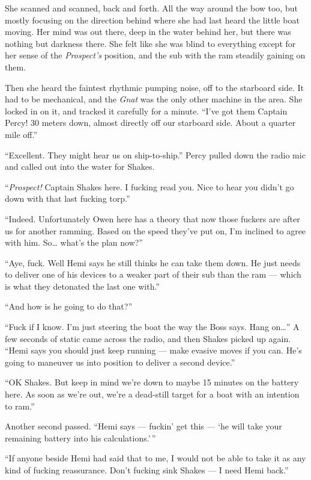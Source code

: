 \documentclass[
]{scrbook}
\begin{document}
She scanned and scanned, back and forth. All the way around the bow too,
but mostly focusing on the direction behind where she had last heard the
little boat moving. Her mind was out there, deep in the water behind
her, but there was nothing but darkness there. She felt like she was
blind to everything except for her sense of the \emph{Prospect's}
position, and the sub with the ram steadily gaining on them.

Then she heard the faintest rhythmic pumping noise, off to the starboard
side. It had to be mechanical, and the \emph{Gnat} was the only other
machine in the area. She locked in on it, and tracked it carefully for a
minute. ``I've got them Captain Percy! 30 meters down, almost directly
off our starboard side. About a quarter mile off.''

``Excellent. They might hear us on ship-to-ship.'' Percy pulled down the
radio mic and called out into the water for Shakes.

``\emph{Prospect!} Captain Shakes here. I fucking read you. Nice to hear
you didn't go down with that last fucking torp.''

``Indeed. Unfortunately Owen here has a theory that now those fuckers
are after us for another ramming. Based on the speed they've put on, I'm
inclined to agree with him. So\ldots{} what's the plan now?''

``Aye, fuck. Well Hemi says he still thinks he can take them down. He
just needs to deliver one of his devices to a weaker part of their sub
than the ram --- which is what they detonated the last one with.''

``And how is he going to do that?''

``Fuck if I know. I'm just steering the boat the way the Boss says. Hang
on\ldots{}'' A few seconds of static came across the radio, and then
Shakes picked up again. ``Hemi says you should just keep running ---
make evasive moves if you can. He's going to maneuver us into position
to deliver a second device.''

``OK Shakes. But keep in mind we're down to maybe 15 minutes on the
battery here. As soon as we're out, we're a dead-still target for a boat
with an intention to ram.''

Another second passed. ``Hemi says --- fuckin' get this --- `he will
take your remaining battery into his calculations.'\,''

``If anyone beside Hemi had said that to me, I would not be able to take
it as any kind of fucking reassurance. Don't fucking sink Shakes --- I
need Hemi back.''
\end{document}
